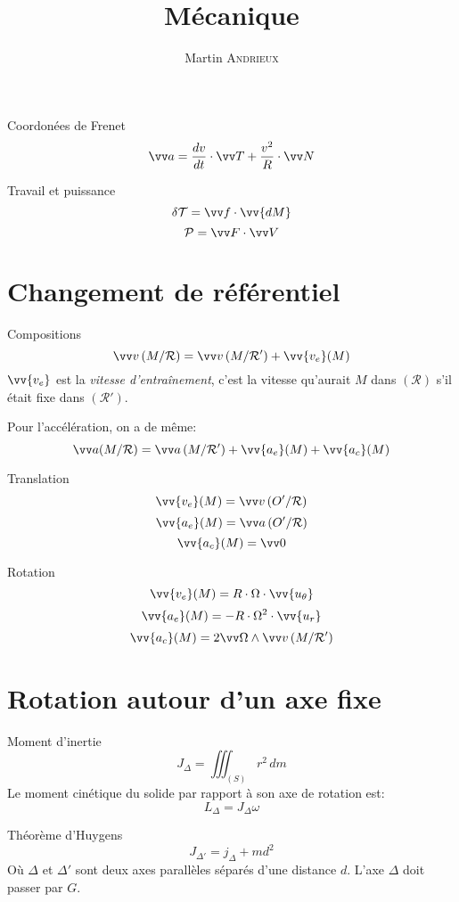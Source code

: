 \documentclass[french, a4paper, 11pt, twocolumn]{article}
\title{Mécanique}
\author{Martin \textsc{Andrieux}}
\date{}
\newcommand{\po}{\left(}         %
\newcommand{\pf}{\right)}        %
\newcommand{\pof}[1]{\po #1 \pf} %
\newcommand{\ur}{\vv{u_r}}          %
\newcommand{\uth}{\vv{u_\theta}}    %
\begin{document}
\maketitle

\begin{cadre}{Coordonées de Frenet}
  \[\vv a = \dfrac{dv}{dt}\cdot\vv T + \dfrac{v^{2}}{R}\cdot\vv N\]
\end{cadre}

\begin{cadre}{Travail et puissance}
  \[\delta\mathcal T = \vv f\cdot\vv{dM}\]
  \[\mathcal P = \vv F \cdot \vv V\]
\end{cadre}

\section{Changement de référentiel}
\begin{cadre}{Compositions}
  \[\vv v \pof{M/\mathcal R} = \vv v\pof{M/\mathcal R'} + \vv{v_{e}}(M)\]
  $\vv{v_{e}}$ est la \emph{vitesse d'entraînement}, c'est la vitesse qu'aurait $M$ dans $(\mathcal R)$ s'il était fixe dans $\pof{\mathcal R'}$.

  Pour l'accélération, on a de même:
  \[\vv a(M/\mathcal R) = \vv a\pof{M/\mathcal R'} + \vv{a_{e}}(M) + \vv{a_{c}}(M)\]
\end{cadre}

\begin{cadre}{Translation}
  \[\vv{v_{e}}(M) = \vv v\pof{O'/\mathcal R}\]
  \[\vv{a_{e}}(M) = \vv a\pof{O'/\mathcal R}\]
  \[\vv{a_{c}}(M) = \vv 0\]
\end{cadre}

\begin{cadre}{Rotation}
  \[\vv{v_{e}}(M) = R\cdot\Omega\cdot\uth\]
  \[\vv{a_{e}}(M) = -R\cdot\Omega^{2}\cdot\ur\]
  \[\vv{a_{c}}(M) = 2\vv\Omega\wedge\vv v\pof{M/\mathcal R'}\]
\end{cadre}

\section{Rotation autour d'un axe fixe}
\begin{cadre}{Moment d'inertie}
  \[J_{\Delta} = \iiint_{(S)}r^{2}\,dm\]
  Le moment cinétique du solide par rapport à son axe de rotation est:
  \[L_{\Delta} = J_{\Delta}\omega\]
\end{cadre}

\begin{cadre}{Théorème d'Huygens}
  \[J_{\Delta'} = j_{\Delta} + md^{2}\]
  Où $\Delta$ et $\Delta'$ sont deux axes parallèles séparés d'une distance $d$. L'axe $\Delta$ doit passer par $G$.
\end{cadre}
\end{document}
